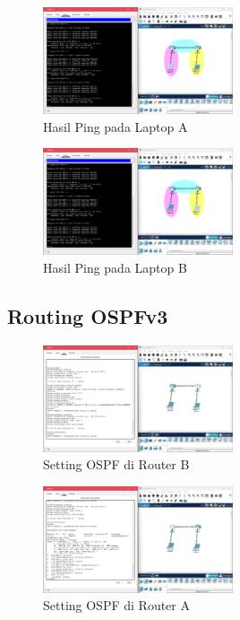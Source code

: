 \begin{figure}[H] 
    \centering
    \includegraphics[width=0.5\textwidth]{tumod/jarkom tumod 7.png} 
    \caption{Hasil Ping pada Laptop A} 
    \label{fig:tumod6} 
\end{figure}

\begin{figure}[H] 
    \centering
    \includegraphics[width=0.5\textwidth]{tumod/jarkom tumod 8.png} 
    \caption{Hasil Ping pada Laptop B} 
    \label{fig:tumod7} 
\end{figure}

\subsection{Routing OSPFv3}

\begin{figure}[H] 
    \centering
    \includegraphics[width=0.5\textwidth]{tumod/jarkom tumod 2.png} 
    \caption{Setting OSPF di Router B} 
    \label{fig:tumod2} 
\end{figure}

\begin{figure}[H] 
    \centering
    \includegraphics[width=0.5\textwidth]{tumod/jarkom tumod 4.png} 
    \caption{Setting OSPF di Router A} 
    \label{fig:tumod3} 
\end{figure}

